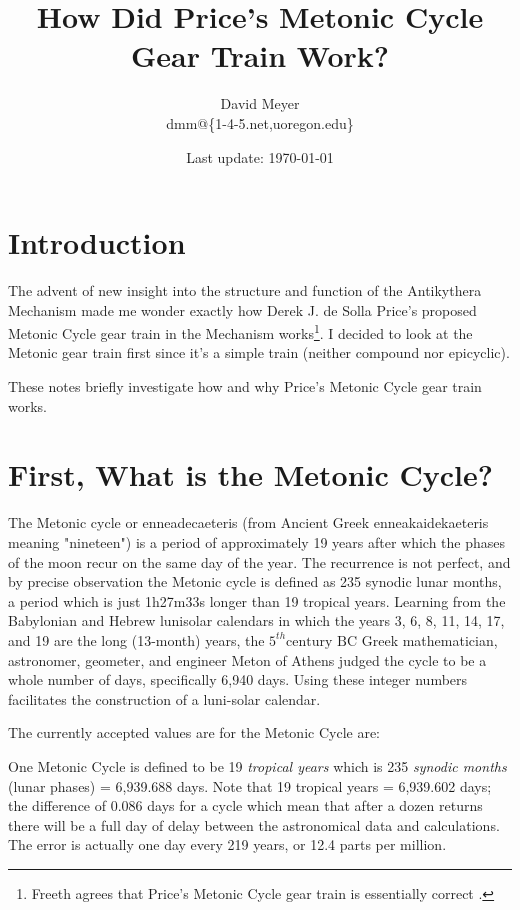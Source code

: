 \documentclass[11pt, oneside]{article}   	%
\title{How Did Price's Metonic Cycle Gear Train Work?}
\author{David Meyer \\ dmm@\{1-4-5.net,uoregon.edu\}}
\date{Last update: \today}							%
\theoremstyle{definition}
\begin{document}
\maketitle

\section{Introduction}
The advent of new insight into the structure and function of the Antikythera Mechanism \cite{Freeth2021} made me wonder exactly how 
Derek J. de Solla Price's \cite{wiki:price} proposed Metonic Cycle gear train in the Mechanism works\footnote{Freeth agrees that Price's Metonic Cycle gear train
is essentially correct \cite{Freeth2006}.}. I decided to look at the Metonic gear train first since it's a simple train (neither compound nor epicyclic).

\bigskip
\noindent
These notes briefly investigate how and why Price's Metonic Cycle gear train works.

\section{First, What is the Metonic Cycle?}
The Metonic cycle or enneadecaeteris (from Ancient Greek enneakaidekaeteris meaning "nineteen") is a period of approximately 19 years after which the 
phases of the moon recur on the same day of the year. The recurrence is not perfect, and by precise observation the Metonic cycle is defined as 235 synodic lunar months, 
a period which is just 1h27m33s longer than 19 tropical years. Learning from the Babylonian and Hebrew lunisolar calendars in which the years 3, 6, 8, 11, 14, 17, and 19 are 
the long (13-month) years, the $5^{th} \text{century BC}$ Greek mathematician, astronomer, geometer, and engineer Meton of Athens judged the cycle to be a whole number of days, 
specifically 6,940 days. Using these integer numbers facilitates the construction of a luni-solar calendar.

\bigskip
\noindent
The currently accepted values are for the Metonic Cycle are:

\bigskip
\noindent
One Metonic Cycle is defined to be 19 \emph{tropical years} which is 235 \emph{synodic months} (lunar phases) =  6,939.688 days. Note that 19 tropical years = 6,939.602 days;
the difference of 0.086 days for a cycle which mean that after a dozen returns there will be a full day of delay between the astronomical data and calculations. 
The error is actually one day every 219 years, or 12.4 parts per million.
\end{document}
